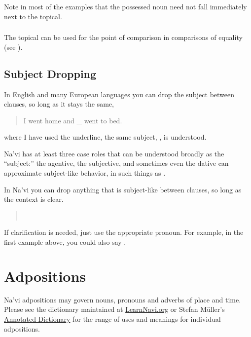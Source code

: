 \noindent Note in most of the examples that the possessed noun need
not fall immediately next to the topical. 
\label{syn:topical:poss}

\subsubsection{} The topical can be used for the point of comparison
in comparisons of equality (see ).


\subsection{Subject Dropping} \label{subject-dropping}
In English and many European languages you can drop the subject
between clauses, so long as it stays the same,

\begin{quotation}
\noindent I went home and \_ went to bed.
\end{quotation}

\noindent where I have used the underline, the same subject, , is
understood.

Na'vi has at least three case roles that can be understood broadly as
the ``subject:'' the agentive, the subjective, and sometimes even the
dative can approximate subject-like behavior, in such things as
 .

In Na'vi you can drop anything that is subject-like between clauses,
so long as the context is clear.

\begin{quotation}
\noindent{} \\
\noindent{} 
\end{quotation}

\noindent If clarification is needed, just use the appropriate
pronoun.  For example, in the first example above, you could also
say .

\section{Adpositions}
\noindent Na'vi adpositions may govern nouns, pronouns and adverbs
of place and time.  Please see the dictionary maintained at
\href{https://learnnavi.org/navi-vocabulary/}{LearnNavi.org} or Stefan
Müller's 
\href{https://forum.learnnavi.org/projects/an-annotated-dictionary-(draft)/}{Annotated Dictionary}
for the range of uses and meanings for individual adpositions.

